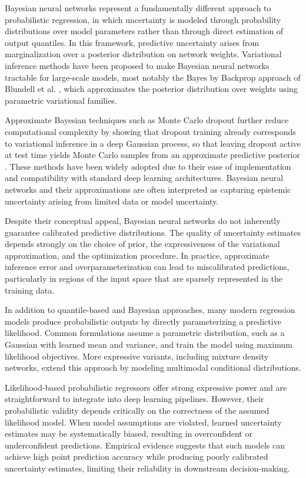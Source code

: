 Bayesian neural networks represent a fundamentally different approach to probabilistic regression, in which uncertainty is modeled through probability distributions over model parameters rather than through direct estimation of output quantiles. In this framework, predictive uncertainty arises from marginalization over a posterior distribution on network weights. Variational inference methods have been proposed to make Bayesian neural networks tractable for large-scale models, most notably the Bayes by Backprop approach of Blundell et al. \cite{blundell2015weight}, which approximates the posterior distribution over weights using parametric variational families.

Approximate Bayesian techniques such as Monte Carlo dropout further reduce computational complexity by showing that dropout training already corresponds to variational inference in a deep Gaussian process, so that leaving dropout active at test time yields Monte Carlo samples from an approximate predictive posterior \cite{gal2016dropout}. These methods have been widely adopted due to their ease of implementation and compatibility with standard deep learning architectures. Bayesian neural networks and their approximations are often interpreted as capturing epistemic uncertainty arising from limited data or model uncertainty.

Despite their conceptual appeal, Bayesian neural networks do not inherently guarantee calibrated predictive distributions. The quality of uncertainty estimates depends strongly on the choice of prior, the expressiveness of the variational approximation, and the optimization procedure. In practice, approximate inference error and overparameterization can lead to miscalibrated predictions, particularly in regions of the input space that are sparsely represented in the training data.

In addition to quantile-based and Bayesian approaches, many modern regression models produce probabilistic outputs by directly parameterizing a predictive likelihood. Common formulations assume a parametric distribution, such as a Gaussian with learned mean and variance, and train the model using maximum likelihood objectives. More expressive variants, including mixture density networks, extend this approach by modeling multimodal conditional distributions.

Likelihood-based probabilistic regressors offer strong expressive power and are straightforward to integrate into deep learning pipelines. However, their probabilistic validity depends critically on the correctness of the assumed likelihood model. When model assumptions are violated, learned uncertainty estimates may be systematically biased, resulting in overconfident or underconfident predictions. Empirical evidence suggests that such models can achieve high point prediction accuracy while producing poorly calibrated uncertainty estimates, limiting their reliability in downstream decision-making.

